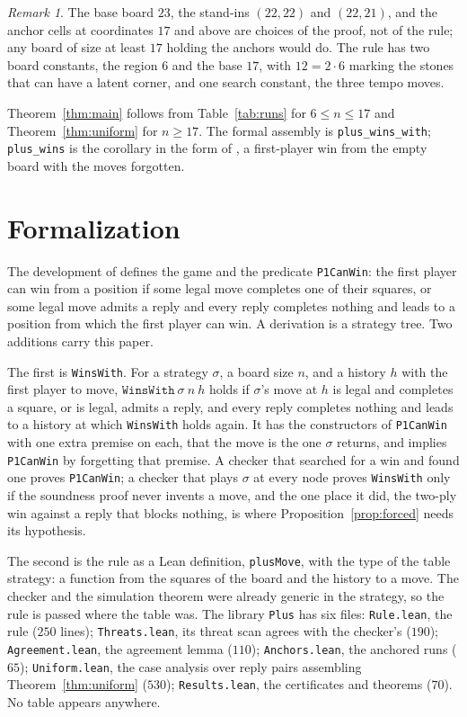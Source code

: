 \documentclass[11pt]{amsart}
\theoremstyle{definition}
\theoremstyle{remark}
\newtheorem{remark}[theorem]{Remark}
\begin{document}
\begin{remark}
The base board $23$, the stand-ins $(22,22)$ and $(22,21)$, and the
anchor cells at coordinates $17$ and above are choices of the proof,
not of the rule; any board of size at least $17$ holding the anchors
would do. The rule has two board constants, the region $6$ and the
base $17$, with $12 = 2 \cdot 6$ marking the stones that can have a
latent corner, and one search constant, the three tempo moves.
\end{remark}

Theorem~\ref{thm:main} follows from Table~\ref{tab:runs} for
$6 \le n \le 17$ and Theorem~\ref{thm:uniform} for $n \ge 17$. The
formal assembly is \texttt{plus\_wins\_with}; \texttt{plus\_wins} is
the corollary in the form of \cite{reid-threshold}, a first-player win
from the empty board with the moves forgotten.

\section{Formalization}\label{sec:lean}

The development of \cite{reid-threshold} defines the game and the
predicate \texttt{P1CanWin}: the first player can win from a position
if some legal move completes one of their squares, or some legal move
admits a reply and every reply completes nothing and leads to a
position from which the first player can win. A derivation is a
strategy tree. Two additions carry this paper.

The first is \texttt{WinsWith}. For a strategy $\sigma$, a board size
$n$, and a history $h$ with the first player to move,
$\texttt{WinsWith}\ \sigma\ n\ h$ holds if $\sigma$'s move at $h$ is
legal and completes a square, or is legal, admits a reply, and every
reply completes nothing and leads to a history at which
\texttt{WinsWith} holds again. It has the constructors of
\texttt{P1CanWin} with one extra premise on each, that the move is the
one $\sigma$ returns, and implies \texttt{P1CanWin} by forgetting that
premise. A checker that searched for a win and found one proves
\texttt{P1CanWin}; a checker that plays $\sigma$ at every node proves
\texttt{WinsWith} only if the soundness proof never invents a move,
and the one place it did, the two-ply win against a reply that blocks
nothing, is where Proposition~\ref{prop:forced} needs its hypothesis.

The second is the rule as a Lean definition, \texttt{plusMove}, with
the type of the table strategy: a function from the squares of the
board and the history to a move. The checker and the simulation
theorem were already generic in the strategy, so the rule is passed
where the table was. The library \texttt{Plus} has six files:
\texttt{Rule.lean}, the rule ($250$ lines); \texttt{Threats.lean}, its
threat scan agrees with the checker's ($190$); \texttt{Agreement.lean},
the agreement lemma ($110$); \texttt{Anchors.lean}, the anchored runs
($65$); \texttt{Uniform.lean}, the case analysis over reply pairs
assembling Theorem~\ref{thm:uniform} ($530$); \texttt{Results.lean},
the certificates and theorems ($70$). No table appears anywhere.
\end{document}
